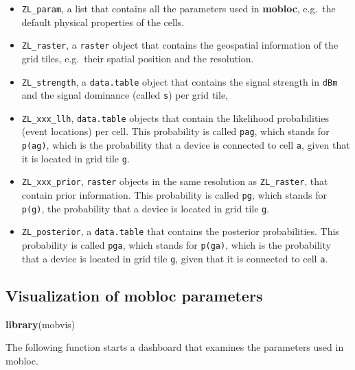 \documentclass[
]{article}
\newenvironment{Shaded}{\begin{snugshade}}{\end{snugshade}}
\newcommand{\KeywordTok}[1]{\textcolor[rgb]{0.13,0.29,0.53}{\textbf{#1}}}
\newcommand{\NormalTok}[1]{#1}
\providecommand{\tightlist}{%
  \setlength{\itemsep}{0pt}\setlength{\parskip}{0pt}}
\begin{document}
\begin{itemize}
\tightlist
\item
  \texttt{ZL\_param}, a list that contains all the parameters used in
  \textbf{mobloc}, e.g.~the default physical properties of the cells.
\item
  \texttt{ZL\_raster}, a \texttt{raster} object that contains the
  geospatial information of the grid tiles, e.g.~their spatial position
  and the resolution.
\item
  \texttt{ZL\_strength}, a \texttt{data.table} object that contains the
  signal strength in \texttt{dBm} and the signal dominance (called
  \texttt{s}) per grid tile,
\item
  \texttt{ZL\_xxx\_llh}, \texttt{data.table} objects that contain the
  likelihood probabilities (event locations) per cell. This probability
  is called \texttt{pag}, which stands for \texttt{p(a\textbar{}g)},
  which is the probability that a device is connected to cell
  \texttt{a}, given that it is located in grid tile \texttt{g}.
\item
  \texttt{ZL\_xxx\_prior}, \texttt{raster} objects in the same
  resolution as \texttt{ZL\_raster}, that contain prior information.
  This probability is called \texttt{pg}, which stands for
  \texttt{p(g)}, the probability that a device is located in grid tile
  \texttt{g}.
\item
  \texttt{ZL\_posterior}, a \texttt{data.table} that contains the
  posterior probabilities. This probability is called \texttt{pga},
  which stands for \texttt{p(g\textbar{}a)}, which is the probability
  that a device is located in grid tile \texttt{g}, given that it is
  connected to cell \texttt{a}.
\end{itemize}

\hypertarget{visualization-of-mobloc-parameters}{%
\subsection{Visualization of mobloc
parameters}\label{visualization-of-mobloc-parameters}}

\begin{Shaded}
\begin{Highlighting}[]
\KeywordTok{library}\NormalTok{(mobvis)}
\end{Highlighting}
\end{Shaded}

The following function starts a dashboard that examines the parameters
used in mobloc.
\end{document}
